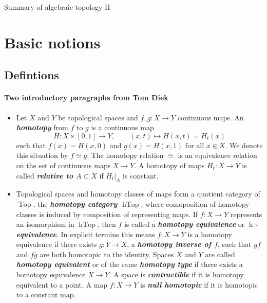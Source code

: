 

{\LARGE Summary of algebraic topology II}

\tableofcontents

\section{Basic notions}\label{sec:Basic notions}
\subsection{Defintions}
\paragraph{Two introductory paragraphs from Tom Diek}
\begin{itemize}
	\item Let $X$ and $Y$ be topological spaces and $f,g:X\to Y$ continuous maps. An \textbf{\textit{homotopy}} from $f$ to $g$ is a continuous map
		\[H:X\times[0,1]\to Y,\qquad(x,t)\mapsto H(x,t)=H_t(x)\]
		such that $f(x)=H(x,0)$ and $g(x)=H(x,1)$ for all $x\in X$. We denote this situation by $f\simeq g$. The homotopy relation $\simeq$ is an equivalence relation on the set of continuous maps $X\to Y$. A homotopy of maps $H_t:X\to Y$ is called \textbf{\textit{relative to $A\subset X$}} if $H_t|_A$ is constant.
		
		\item Topological spaces and homotopy classes of maps form a quotient category of $\operatorname{Top}$, the \textbf{\textit{homotopy category $\operatorname{hTop}$}}, where comoposition of homotopy classes is induced by composition of representing maps. If $f:X\to Y$ represents an isomorphism in $\operatorname{hTop}$, then $f$ is called a \textbf{\textit{homotopy equivalence}} or \textbf{\textit{$\operatorname{h}$-equivalence}}. In explicit termins this means $f:X\to Y$ is a homotopy equivalence if there exists $g:Y\to X$, a \textbf{\textit{homotopy inverse of $f$}}, such that $gf$ and $fg$ are both homotopic to the identity. Spaces $X$ and $Y$ are called \textbf{\textit{homotopy equivalent}} or of the same \textbf{\textit{homotopy type}} if there exists a homotopy equivalence $X\to Y$. A space is \textbf{\textit{contractible}} if it is homotopy equivalent to a point. A map $f:X\to Y$ is \textbf{\textit{null homotopic}} if it is homotopic to a constant map.
\end{itemize}

